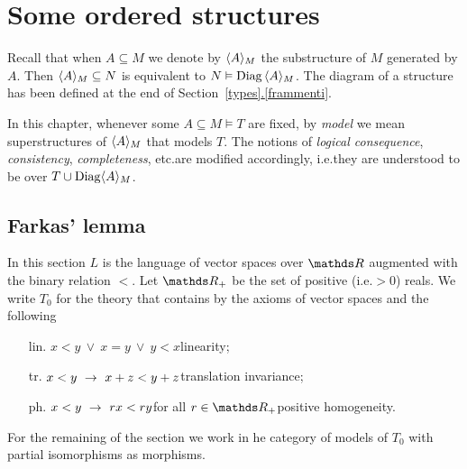 \documentclass[creche.tex]{subfiles}
\begin{document}
\chapter{Some ordered structures}
\label{saturation}
 
\def\medrel#1{\parbox[t]{5ex}{$\displaystyle\hfil #1$}}
\def\ceq#1#2#3{\parbox{15ex}{$\displaystyle #1$}\medrel{#2}$\displaystyle  #3$}





\begin{notation}\label{notation1}
Recall that when $A\subseteq M$ we denote by \emph{$\langle A\rangle_M$\/} the substructure of $M$ generated by $A$. Then $\langle A\rangle_M\subseteq N$ is equivalent to $N\vDash {\rm Diag}\,\langle A\rangle_M$. The diagram of a structure has been defined at the end of Section~\hyperref[frammenti]{\ref*{types}.\ref*{frammenti}}.

In this chapter, whenever some $A\subseteq M\models T$ are fixed, by \textit{model\/} we mean superstructures of $\langle A\rangle_M$ that models $T$. The notions of \textit{logical consequence}, \textit{consistency}, \textit{completeness}, etc.\@ are modified accordingly, i.e.\@ they are understood to be over $T\cup{\rm Diag}\langle A\rangle_M$.\QED
\end{notation}



\section{Farkas' lemma}
In this section $L$ is the language of vector spaces over $\RR$ augmented with the binary relation $<$. Let \emph{$\RR_+$\/} be the set of positive (i.e.\@ $>0$) reals. We write \emph{$T_0$\/} for the theory that contains by the axioms of vector spaces and the following

\begin{itemize}
\item[lin.] $x<y\ \vee\ x=y\ \vee\  y<x$\hfill linearity;
\item[tr.] $x<y\ \rightarrow\ x+z < y+z$\hfill translation invariance;
\item[ph.] $x<y\ \rightarrow\ r x < r y$\quad for all $r\in\RR_+$\hfill positive homogeneity.
\end{itemize}
For the remaining of the section we work in he category of models of $T_0$ with partial isomorphisms as morphisms. 
\end{document}
